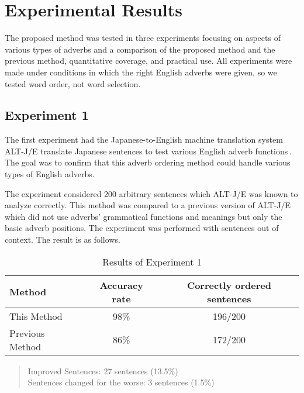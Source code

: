 \section{Experimental Results}
\label{sec:results}

The proposed method was tested in three experiments focusing on aspects of
various types of adverbs and a comparison of the proposed method and the
previous method, quantitative coverage, and practical
use. All experiments were made under conditions in which the right English 
adverbs were given, so we tested word order, not word selection.

\subsection{Experiment 1}

The first experiment had the Japanese-to-English machine 
translation system ALT-J/E translate Japanese sentences to test various 
English adverb functions\,\cite{Ikehara:94}. The goal was to confirm 
that this adverb ordering method could handle various types of 
English adverbs.

The experiment considered 200 arbitrary sentences which ALT-J/E was
known to analyze correctly.  This method was compared to a previous
version of ALT-J/E which did not use adverbs' grammatical functions
and meanings but only the basic adverb positions.  The experiment was
performed with sentences out of context.  The result is as follows.

\begin{singlespace}
\begin{table}[ht]
\begin{center}
\caption{Results of Experiment 1}
 \begin{tabular}{|l|c|c|}
 \hline
 Method           &  Accuracy rate &  Correctly ordered sentences \\ \hline
 This Method      &       98\%     &         196/200              \\ \hline
 Previous Method  &       86\%     &         172/200              \\ \hline
 \end{tabular}
\vspace*{-1mm}
\end{center}
 \begin{quote}
  \small
 \hspace*{2cm} Improved Sentences: 27 sentences (13.5\%) \\
 \hspace*{2cm} Sentences changed for the worse: 3 sentences (1.5\%)
 \end{quote}
\end{table}
\end{singlespace}

